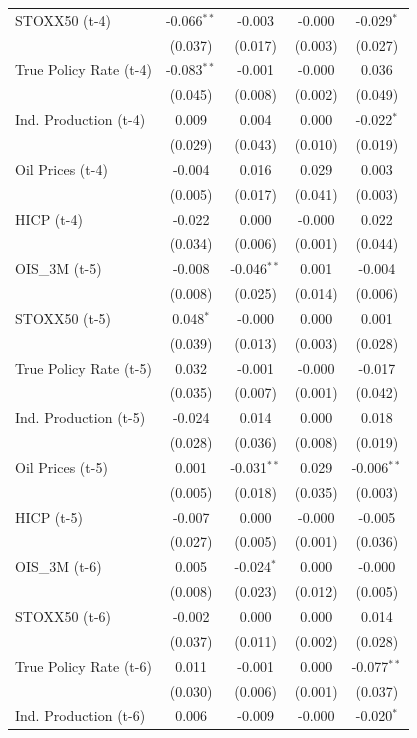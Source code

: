 \begin{longtable}[t]{lcccc}
STOXX50 (t-4) & -0.066$^{**}$ & -0.003 & -0.000 & -0.029$^{*}$\\
 & (0.037) & (0.017) & (0.003) & (0.027)\\
True Policy Rate (t-4) & -0.083$^{**}$ & -0.001 & -0.000 & 0.036\\
 & (0.045) & (0.008) & (0.002) & (0.049)\\
Ind. Production (t-4) & 0.009 & 0.004 & 0.000 & -0.022$^{*}$\\
 & (0.029) & (0.043) & (0.010) & (0.019)\\
Oil Prices (t-4) & -0.004 & 0.016 & 0.029 & 0.003\\
 & (0.005) & (0.017) & (0.041) & (0.003)\\
HICP (t-4) & -0.022 & 0.000 & -0.000 & 0.022\\
 & (0.034) & (0.006) & (0.001) & (0.044)\\
OIS\_3M (t-5) & -0.008 & -0.046$^{**}$ & 0.001 & -0.004\\
 & (0.008) & (0.025) & (0.014) & (0.006)\\
STOXX50 (t-5) & 0.048$^{*}$ & -0.000 & 0.000 & 0.001\\
 & (0.039) & (0.013) & (0.003) & (0.028)\\
True Policy Rate (t-5) & 0.032 & -0.001 & -0.000 & -0.017\\
 & (0.035) & (0.007) & (0.001) & (0.042)\\
Ind. Production (t-5) & -0.024 & 0.014 & 0.000 & 0.018\\
 & (0.028) & (0.036) & (0.008) & (0.019)\\
Oil Prices (t-5) & 0.001 & -0.031$^{**}$ & 0.029 & -0.006$^{**}$\\
 & (0.005) & (0.018) & (0.035) & (0.003)\\
HICP (t-5) & -0.007 & 0.000 & -0.000 & -0.005\\
 & (0.027) & (0.005) & (0.001) & (0.036)\\
OIS\_3M (t-6) & 0.005 & -0.024$^{*}$ & 0.000 & -0.000\\
 & (0.008) & (0.023) & (0.012) & (0.005)\\
STOXX50 (t-6) & -0.002 & 0.000 & 0.000 & 0.014\\
 & (0.037) & (0.011) & (0.002) & (0.028)\\
True Policy Rate (t-6) & 0.011 & -0.001 & 0.000 & -0.077$^{**}$\\
 & (0.030) & (0.006) & (0.001) & (0.037)\\
Ind. Production (t-6) & 0.006 & -0.009 & -0.000 & -0.020$^{*}$\\

\end{longtable}

